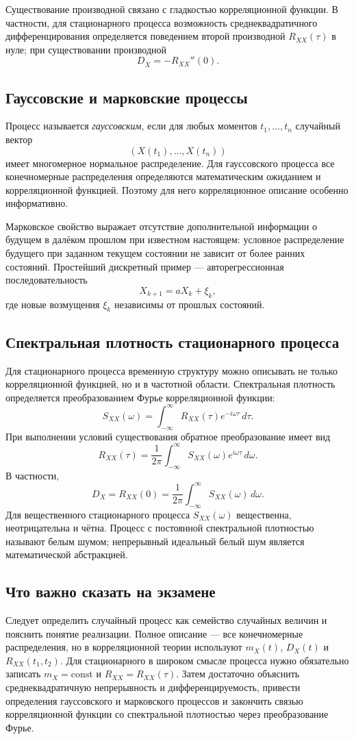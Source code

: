 Существование производной связано с гладкостью корреляционной функции. В
частности, для стационарного процесса возможность среднеквадратичного
дифференцирования определяется поведением второй производной
$R_{XX}(\tau)$ в нуле; при существовании производной
\[
    D_{\dot X}=-R_{XX}''(0).
\]

\subsection{Гауссовские и марковские процессы}

Процесс называется \emph{гауссовским}, если для любых моментов
$t_1,\ldots,t_n$ случайный вектор
\[
    (X(t_1),\ldots,X(t_n))
\]
имеет многомерное нормальное распределение. Для гауссовского процесса все
конечномерные распределения определяются математическим ожиданием и
корреляционной функцией. Поэтому для него корреляционное описание особенно
информативно.

Марковское свойство выражает отсутствие дополнительной информации о будущем в
далёком прошлом при известном настоящем: условное распределение будущего при
заданном текущем состоянии не зависит от более ранних состояний. Простейший
дискретный пример --- авторегрессионная последовательность
\[
    X_{k+1}=aX_k+\xi_k,
\]
где новые возмущения $\xi_k$ независимы от прошлых состояний.

\subsection{Спектральная плотность стационарного процесса}

Для стационарного процесса временную структуру можно описывать не только
корреляционной функцией, но и в частотной области. Спектральная плотность
определяется преобразованием Фурье корреляционной функции:
\[
    S_{XX}(\omega)
    =\int_{-\infty}^{\infty}R_{XX}(\tau)e^{-i\omega\tau}\,d\tau.
\]
При выполнении условий существования обратное преобразование имеет вид
\[
    R_{XX}(\tau)
    =\frac{1}{2\pi}\int_{-\infty}^{\infty}
      S_{XX}(\omega)e^{i\omega\tau}\,d\omega.
\]
В частности,
\[
    D_X=R_{XX}(0)
    =\frac{1}{2\pi}\int_{-\infty}^{\infty}S_{XX}(\omega)\,d\omega.
\]
Для вещественного стационарного процесса $S_{XX}(\omega)$ вещественна,
неотрицательна и чётна. Процесс с постоянной спектральной плотностью называют
белым шумом; непрерывный идеальный белый шум является математической
абстракцией.

\subsection{Что важно сказать на экзамене}

Следует определить случайный процесс как семейство случайных величин и пояснить
понятие реализации. Полное описание --- все конечномерные распределения, но в
корреляционной теории используют $m_X(t)$, $D_X(t)$ и
$R_{XX}(t_1,t_2)$. Для стационарного в широком смысле процесса нужно обязательно
записать $m_X=\mathrm{const}$ и $R_{XX}=R_{XX}(\tau)$. Затем достаточно
объяснить среднеквадратичную непрерывность и дифференцируемость, привести
определения гауссовского и марковского процессов и закончить связью
корреляционной функции со спектральной плотностью через преобразование Фурье.

\newpage
